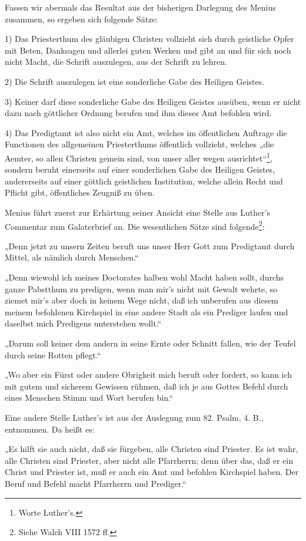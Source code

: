 Fassen wir abermals das Resultat aus der bisherigen Darlegung des Menius zusammen, so ergeben sich folgende Sätze:

1) Das Priesterthum des gläubigen Christen vollzieht sich durch geistliche Opfer mit Beten, Danksagen und allerlei
guten Werken und gibt an und für sich noch nicht Macht, die Schrift auszulegen, aus der Schrift zu lehren.

2) Die Schrift auszulegen ist eine sonderliche Gabe des Heiligen Geistes.

3) Keiner darf diese sonderliche Gabe des Heiligen Geistes ausüben, wenn er nicht dazu nach göttlicher Ordnung
berufen und ihm dieses Amt befohlen wird.

4) Das Predigtamt ist also nicht ein Amt, welches im öffentlichen Auftrage die Functionen des allgemeinen
Priesterthums öffentlich vollzieht, welches „die Aemter, so allen Christen gemein sind, von unser aller wegen
ausrichtet“\footnote{Worte Luther’s.}, sondern beruht einerseits auf einer sonderlichen Gabe des Heiligen Geistes, andererseits auf
einer göttlich geistlichen Institution, welche allein Recht und Pflicht gibt, öffentliches Zeugniß zu üben.

Menius führt zuerst zur Erhärtung seiner Ansicht eine Stelle aus Luther’s Commentar zum Galaterbrief an. Die
wesentlichen Sätze sind folgende\footnote{Siehe Walch VIII 1572 ff.}:

„Denn jetzt zu unsern Zeiten beruft uns unser Herr Gott zum Predigtamt durch Mittel, als nämlich durch Menschen.“

„Denn wiewohl ich meines Doctorates halben wohl Macht haben sollt, durchs ganze Pabstthum zu predigen, wenn man
mir’s nicht mit Gewalt wehrte, so ziemet mir’s aber doch in keinem Wege nicht, daß ich unberufen aus diesem meinem
befohlenen Kirchspiel in eine andere Stadt als ein Prediger laufen und daselbst mich Predigens unterstehen wollt.“

„Darum soll keiner dem andern in seine Ernte oder Schnitt fallen, wie der Teufel durch seine Rotten pflegt.“

„Wo aber ein Fürst oder andere Obrigkeit mich beruft oder fordert, so kann ich mit gutem und sicherem Gewissen
rühmen, daß ich je aus Gottes Befehl durch eines Menschen Stimm und Wort berufen bin.“

Eine andere Stelle Luther’s ist aus der Auslegung zum 82. Psalm, 4. B., entnommen. Da heißt es:

„Es hilft sie auch nicht, daß sie fürgeben, alle Christen sind Priester. Es ist wahr, alle Christen sind
Priester, aber nicht alle Pfarrherrn; denn über das, daß er ein Christ und Priester ist, muß er auch ein Amt
und befohlen Kirchspiel haben. Der Beruf und Befehl macht Pfarrherrn und Prediger.“

